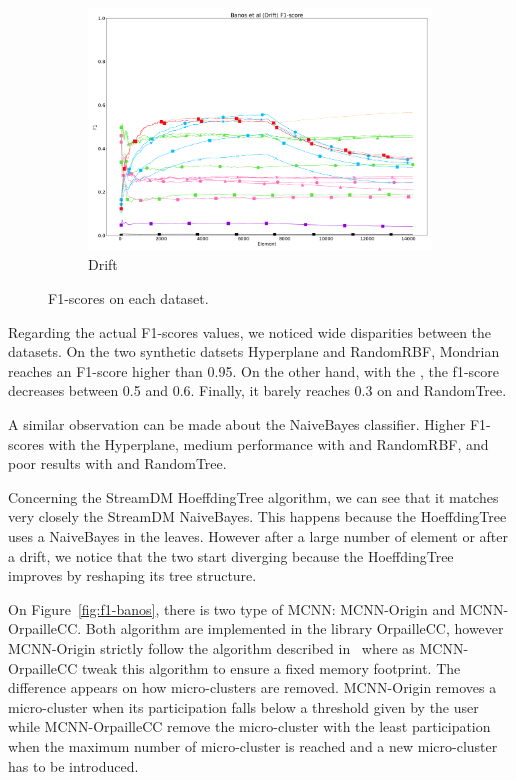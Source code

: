 \begin{figure}[ht]
\begin{subfigure}[t]{.5\linewidth}
		\includegraphics[width=\linewidth]{figures/results/drift_f1.png}
		\caption{Drift}
		\label{fig:f1-drift}
	\end{subfigure}

	\caption{F1-scores on each dataset.}
	\label{fig:f1}
\end{figure}

Regarding the actual F1-scores values, we noticed wide disparities between the
datasets. On the two synthetic datsets Hyperplane and RandomRBF, Mondrian
reaches an F1-score higher than 0.95. On the other hand, with the
\banosdataset, the f1-score decreases between 0.5 and 0.6.  Finally, it barely
reaches 0.3 on \recofitdataset and RandomTree.

A similar observation can be made about the NaiveBayes classifier. Higher
F1-scores with the Hyperplane, medium performance with \banosdataset and
RandomRBF, and poor results with \recofitdataset and RandomTree.

Concerning the StreamDM HoeffdingTree algorithm, we can see that it matches
very closely the StreamDM NaiveBayes. This happens because the HoeffdingTree
uses a NaiveBayes in the leaves. However after a large number of element or
after a drift, we notice that the two start diverging because the HoeffdingTree
improves by reshaping its tree structure.

On Figure~\ref{fig:f1-banos}, there is two type of MCNN: MCNN-Origin and
MCNN-OrpailleCC.  Both algorithm are implemented in the library OrpailleCC,
however MCNN-Origin strictly follow the algorithm described in~\cite{mc-nn}
where as MCNN-OrpailleCC tweak this algorithm to ensure a fixed memory
footprint. The difference appears on how micro-clusters are removed.
MCNN-Origin removes a micro-cluster when its participation falls below a
threshold given by the user while MCNN-OrpailleCC remove the micro-cluster with
the least participation when the maximum number of micro-cluster is reached and
a new micro-cluster has to be introduced.

